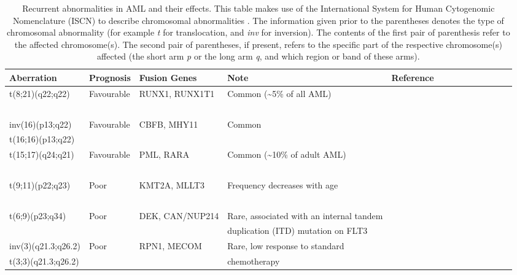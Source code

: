 \begin{landscape}
	\pagestyle{empty} %
\begin{table}[h]
\label{tab:karyotype}
    \centering
    \caption{Recurrent abnormalities in AML and their effects. This table makes use of the International System for Human Cytogenomic Nomenclature (ISCN) to describe chromosomal abnormalities \citep{ISCN}. The information given prior to the parentheses denotes the type of chromosomal abnormality (for example \textit{t} for translocation, and \textit{inv} for inversion). The contents of the first pair of parenthesis refer to the affected chromosome(s). The second pair of parentheses, if present, refers to the specific part of the respective chromosome(s) affected (the short arm \textit{p} or the long arm \textit{q}, and which region or band of these arms).}
    \begin{tabular}{lllllllllllll}
    \toprule
        \textbf{Aberration} & \textbf{Prognosis} & \textbf{Fusion Genes} & \textbf{Note} & \textbf{Reference}  & ~ \\ \midrule
        t(8;21)(q22;q22) & Favourable & RUNX1, RUNX1T1 & Common (\textasciitilde 5\% of all AML) & \cite{reikvam2011acute}  & ~ \\ 
        ~ & ~ & ~ & ~ & \cite{peterson20048}  & ~ \\ \hline
        inv(16)(p13;q22) & Favourable & CBFB, MHY11 & Common & \cite{plantier1994inv}  & ~ \\ 
        t(16;16)(p13;q22) & ~ & ~ & ~ & \cite{shigesada2004mechanism}  & ~ \\ \hline
        t(15;17)(q24;q21) & Favourable & PML, RARA  & Common (\textasciitilde 10\% of adult AML) & \cite{de2014rara}  & ~ \\ 
        ~ & ~ & ~ & ~ &   & ~ \\ \hline
        t(9;11)(p22;q23) & Poor & KMT2A, MLLT3 & Frequency decreases with age & \cite{chandra2010acute}  & ~ \\ 
        ~ & ~ & ~ & ~ & \cite{metzler2004emergence}  & ~ \\ \hline
        t(6;9)(p23;q34) & Poor & DEK, CAN/NUP214 & Rare, associated with an internal tandem & \cite{chi2008acute}  & ~ \\ 
        ~ & ~ & ~ &  duplication (ITD) mutation on FLT3 &   & ~ \\ \hline
        inv(3)(q21.3;q26.2) & Poor & RPN1, MECOM & Rare, low response to standard  & \cite{sitges2020acute} & ~ \\ 
        t(3;3)(q21.3;q26.2) & ~ & ~ & chemotherapy & ~ & ~ \\ \hline

\end{tabular}
\end{table}
\end{landscape}
